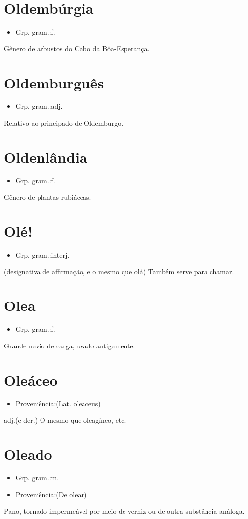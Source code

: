 \section{Oldembúrgia}
\begin{itemize}
\item {Grp. gram.:f.}
\end{itemize}
Gênero de arbustos do Cabo da Bôa-Esperança.
\section{Oldemburguês}
\begin{itemize}
\item {Grp. gram.:adj.}
\end{itemize}
Relativo ao principado de Oldemburgo.
\section{Oldenlândia}
\begin{itemize}
\item {Grp. gram.:f.}
\end{itemize}
Gênero de plantas rubiáceas.
\section{Olé!}
\begin{itemize}
\item {Grp. gram.:interj.}
\end{itemize}
(designativa de \textunderscore affirmação\textunderscore , e o mesmo que \textunderscore olá\textunderscore )
Também serve para chamar.
\section{Olea}
\begin{itemize}
\item {Grp. gram.:f.}
\end{itemize}
Grande navio de carga, usado antigamente.
\section{Oleáceo}
\begin{itemize}
\item {Proveniência:(Lat. \textunderscore oleaceus\textunderscore )}
\end{itemize}
\textunderscore adj.\textunderscore  (e der.)
O mesmo que \textunderscore oleagíneo\textunderscore , etc.
\section{Oleado}
\begin{itemize}
\item {Grp. gram.:m.}
\end{itemize}
\begin{itemize}
\item {Proveniência:(De \textunderscore olear\textunderscore )}
\end{itemize}
Pano, tornado impermeável por meio de verniz ou de outra substância análoga.
